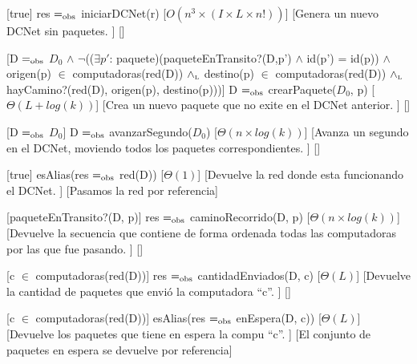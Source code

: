 \begin{Interfaz}
  
  
  

  [true]%
  {res $=_{\mathrm{obs}}$ iniciarDCNet(r)}%
  [$O(n^3 \times (I \times L \times n!))$]%
  [Genera un nuevo DCNet sin paquetes. ]%
  []%
  
  [D $=_{\mathrm{obs}}$ $D_{0}$ $\land$ $\neg$(($\exists p'$: paquete)(paqueteEnTransito?(D,p') $\land$ id(p') = id(p)) $\land$ origen(p) $\in$ computadoras(red(D)) $\land_{\mathrm{\scriptscriptstyle{L}}}$ destino(p) $\in$ computadoras(red(D)) $\land_{\mathrm{\scriptscriptstyle{L}}}$ hayCamino?(red(D), origen(p), destino(p)))]%
  {D $=_{\mathrm{obs}}$ crearPaquete($D_{0}$, p)}%
  [$\Theta(L+log(k))$]%
  [Crea un nuevo paquete que no exite en el DCNet anterior. ]%
  []%

  [D $=_{\mathrm{obs}}$ $D_{0}$]%
  {D $=_{\mathrm{obs}}$ avanzarSegundo($D_{0}$)}%
  [$\Theta(n \times log(k))$]%
  [Avanza un segundo en el DCNet, moviendo todos los paquetes correspondientes. ]%
  []%

  [true]%
  {esAlias(res $=_{\mathrm{obs}}$ red(D))}%
  [$\Theta(1)$]%
  [Devuelve la red donde esta funcionando el DCNet. ]%
  [Pasamos la red por referencia]%

  [paqueteEnTransito?(D, p)]%
  {res $=_{\mathrm{obs}}$ caminoRecorrido(D, p)}%
  [$\Theta(n \times log(k))$]%
  [Devuelve la secuencia que contiene de forma ordenada todas las computadoras por las que fue pasando. ]%
  []%

  [c $\in$ computadoras(red(D))]%
  {res $=_{\mathrm{obs}}$ cantidadEnviados(D, c)}%
  [$\Theta(L)$]%
  [Devuelve la cantidad de paquetes que envi\'o la computadora ``c''. ]%
  []%

  [c $\in$ computadoras(red(D))]%
  {esAlias(res $=_{\mathrm{obs}}$ enEspera(D, c))}%
  [$\Theta(L)$]%
  [Devuelve los paquetes que tiene en espera la compu ``c''. ]%
  [El conjunto de paquetes en espera se devuelve por referencia]%


\end{Interfaz}
